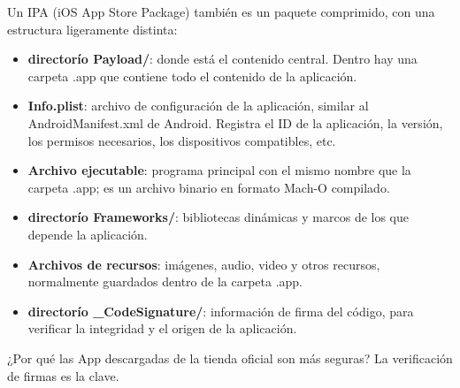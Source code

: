 
Un IPA (iOS App Store Package) también es un paquete comprimido, con una estructura ligeramente distinta:

\begin{itemize}
  \item \textbf{directorío Payload/}: donde está el contenido central. Dentro hay una carpeta .app que contiene todo el contenido de la aplicación.
  \item \textbf{Info.plist}: archivo de configuración de la aplicación, similar al AndroidManifest.xml de Android. Registra el ID de la aplicación, la versión, los permisos necesarios, los dispositivos compatibles, etc.
  \item \textbf{Archivo ejecutable}: programa principal con el mismo nombre que la carpeta .app; es un archivo binario en formato Mach-O compilado.
  \item \textbf{directorío Frameworks/}: bibliotecas dinámicas y marcos de los que depende la aplicación.
  \item \textbf{Archivos de recursos}: imágenes, audio, video y otros recursos, normalmente guardados dentro de la carpeta .app.
  \item \textbf{directorío \_CodeSignature/}: información de firma del código, para verificar la integridad y el origen de la aplicación.
\end{itemize}


¿Por qué las App descargadas de la tienda oficial son más seguras? La verificación de firmas es la clave.

